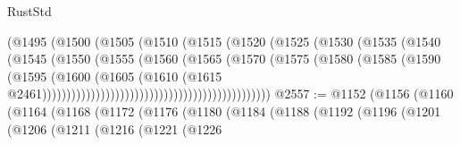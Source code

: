 \begin{lexlean}{RustStd}
\begin{coremodule}
{\begin{coremodule}
{{{{{{{{{{{{{{{{{{{{{{{{{{{{{{{{{{{{{{{{{{{{{{{{{{{{{{{{{{{{                                                (@1495
                                                  (@1500
                                                    (@1505
                                                      (@1510
                                                        (@1515
                                                          (@1520
                                                            (@1525
                                                              (@1530
                                                                (@1535
                                                                  (@1540
                                                                    (@1545
                                                                      (@1550
                                                                        (@1555
                                                                          (@1560
                                                                            (@1565
                                                                              (@1570
                                                                                (@1575
                                                                                  (@1580
                                                                                    (@1585
                                                                                      (@1590
                                                                                        (@1595
                                                                                          (@1600
                                                                                            (@1605
                                                                                              (@1610
                                                                                                (@1615
                                                                                                  @2461)))))))))))))))))))))))))))))))))))))))))))))))
@2557 := @1152
    (@1156
      (@1160
        (@1164
          (@1168
            (@1172
              (@1176
                (@1180
                  (@1184
                    (@1188
                      (@1192
                        (@1196
                          (@1201
                            (@1206
                              (@1211
                                (@1216
                                  (@1221
                                    (@1226
}}}}}}}}}}}}}}}}}}}}}}}}}}}}}}}}}}}}}}}}}}}}}}}}}}}}}}}}}}}}
\end{coremodule}}
\end{coremodule}
\end{lexlean}
